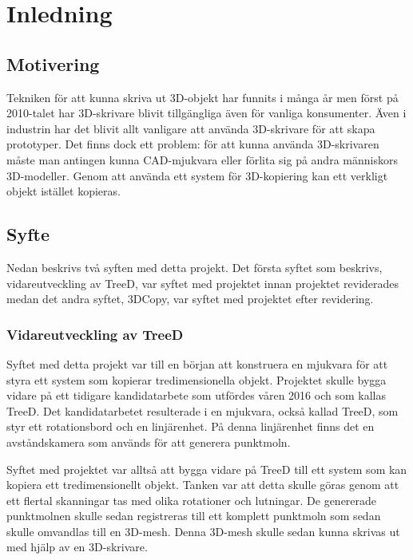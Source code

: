 \chapter{Inledning}
\label{cha:introduction}
 
\section{Motivering}
\label{sec:motivation}
Tekniken för att kunna skriva ut 3D-objekt har funnits i många år men först på 2010-talet har 3D-skrivare blivit tillgängliga även för vanliga konsumenter. Även i industrin har det blivit allt vanligare att använda 3D-skrivare för att skapa prototyper. Det finns dock ett problem: för att kunna använda 3D-skrivaren måste man antingen kunna CAD-mjukvara eller förlita sig på andra människors 3D-modeller. Genom att använda ett system för 3D-kopiering kan ett verkligt objekt istället kopieras.


\section{Syfte}
\label{sec:aim}

Nedan beskrivs två syften med detta projekt. Det första syftet som beskrivs, vidareutveckling av TreeD, var syftet med projektet innan projektet reviderades medan det andra syftet, 3DCopy, var syftet med projektet efter revidering.

\subsection{Vidareutveckling av TreeD}
Syftet med detta projekt var till en början att konstruera en mjukvara för att styra ett system som kopierar tredimensionella objekt. Projektet skulle bygga vidare på ett tidigare kandidatarbete som utfördes våren 2016 och som kallas TreeD. Det kandidatarbetet resulterade i en mjukvara, också kallad TreeD, som styr ett rotationsbord och en linjärenhet. På denna linjärenhet finns det en avståndskamera som används för att generera punktmoln. 

Syftet med projektet var alltså att bygga vidare på TreeD till ett system som kan kopiera ett tredimensionellt objekt. Tanken var att detta skulle göras genom att ett flertal skanningar tas med olika rotationer och lutningar. De genererade punktmolnen skulle sedan registreras till ett komplett punktmoln som sedan skulle omvandlas till en 3D-mesh. Denna 3D-mesh skulle sedan kunna skrivas ut med hjälp av en 3D-skrivare.


